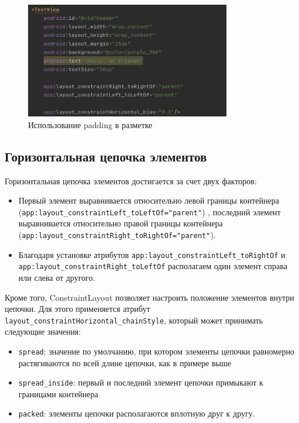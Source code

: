 \begin{figure}[h!tp]
	\centering
	\includegraphics[width=0.8\textwidth]{Screenshot from 2023-03-11 18-55-02.png}
	\caption{Использование padding в разметке}
	\label{fig:xml:shift}
\end{figure}

\subsection{Горизонтальная цепочка элементов}
Горизонтальная цепочка элементов достигается за счет двух факторов:
\begin{itemize}
	\item Первый элемент выравнивается относительно левой границы
		контейнера (\texttt{app:layout\_constraintLeft\_toLeftOf="parent"})
		, последний
		элемент выравнивается относительно правой границы контейнера
		(\texttt{app:layout\_constraintRight\_toRightOf="parent"}).
	\item Благодаря установке атрибутов
		\texttt{app:layout\_constraintLeft\_toRightOf} и
		\texttt{app:layout\_constraintRight\_toLeftOf}
		располагаем один элемент справа или слева от другого.
\end{itemize}

Кроме того, ConstraintLayout позволяет настроить положение элементов
внутри цепочки. Для этого применяется атрибут
\texttt{layout\_constraintHorizontal\_chainStyle},
который может принимать следующие значения:
\label{tag:chain:style}
\begin{itemize}
	\item \texttt{spread}: значение по умолчанию, при котором элементы цепочки
		равномерно растягиваются по всей длине цепочки, как в примере выше
	\item \texttt{spread\_inside}: первый и последний элемент цепочки
		примыкают к границами контейнера
	\item \texttt{packed}: элементы цепочки располагаются вплотную
		друг к другу.
\end{itemize}

